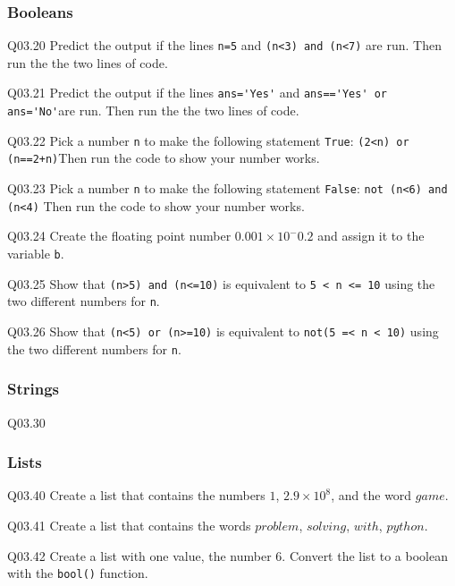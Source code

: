 \documentclass{book}
\begin{document}
    
        \subsubsection{Booleans}\label{booleans}

Q03.20 Predict the output if the lines \lstinline!n=5! and
\lstinline!(n<3) and (n<7)! are run. Then run the the two lines of code.

Q03.21 Predict the output if the lines \lstinline!ans='Yes'! and
\lstinline!ans=='Yes' or ans='No'!are run. Then run the the two lines of
code.

Q03.22 Pick a number \lstinline!n! to make the following statement
\lstinline!True!: \lstinline!(2<n) or (n==2+n)!Then run the code to show
your number works.

Q03.23 Pick a number \lstinline!n! to make the following statement
\lstinline!False!: \lstinline!not (n<6) and (n<4)! Then run the code to
show your number works.

Q03.24 Create the floating point number \(0.001 \times 10^-0.2\) and
assign it to the variable \lstinline!b!.

Q03.25 Show that \lstinline!(n>5) and (n<=10)! is equivalent to
\lstinline!5 < n <= 10! using the two different numbers for
\lstinline!n!.

Q03.26 Show that \lstinline!(n<5) or (n>=10)! is equivalent to
\lstinline!not(5 =< n < 10)! using the two different numbers for
\lstinline!n!.
    




    
        \subsubsection{Strings}\label{strings}

Q03.30
    




    
        \subsubsection{Lists}\label{lists}

Q03.40 Create a list that contains the numbers \(1\),
\(2.9 \times 10^8\), and the word \(game\).

Q03.41 Create a list that contains the words \(problem\), \(solving\),
\(with\), \(python\).

Q03.42 Create a list with one value, the number \(6\). Convert the list
to a boolean with the \lstinline!bool()! function.
\end{document}
